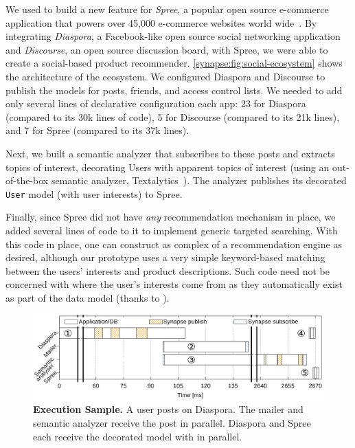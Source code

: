 We used \synapse to build a new feature for \emph{Spree}, a popular open source
e-commerce application that powers over 45,000 e-commerce websites world wide~\cite{spree-site}.
By integrating \emph{Diaspora}, a Facebook-like open source social networking
application and \emph{Discourse}, an open source discussion board, with Spree, we
were able to create a social-based product recommender.
\F\ref{synapse:fig:social-ecosystem} shows the architecture of the ecosystem.
We configured Diaspora and Discourse to publish the models
for posts, friends, and access control lists.
We needed to add only several lines of declarative configuration each app: 23
for Diaspora (compared to its 30k lines of code), 5 for Discourse (compared to
its 21k lines), and 7 for Spree (compared to its 37k lines).

Next, we built a semantic analyzer that subscribes to these posts and extracts topics of interest, decorating Users with apparent topics of interest (using an out-of-the-box semantic analyzer, Textalytics~\cite{textalytics}).
The analyzer publishes its decorated {\tt User} model (with user interests) to Spree.

Finally, since Spree did not have \emph{any} recommendation mechanism in place, we added several lines of code to it to implement generic targeted searching.
With this code in place, one can construct as complex of a recommendation engine as
desired, although our prototype uses a very simple keyword-based matching
between the users' interests and product descriptions. Such code need not be
concerned with where the user's interests come from as they
automatically exist as part of the data model (thanks to \synapse).




\begin{figure}
  \centering
  \includegraphics[width=\linewidth]{figures/synapse/diaspora1.pdf}
  \caption{{\bf Execution Sample.}
      A user posts on Diaspora. The mailer  and semantic
     analyzer  receive the post in parallel. Diaspora  and Spree
      each receive the decorated model with in parallel.}
  \label{synapse:fig:diaspora1}
\end{figure}


